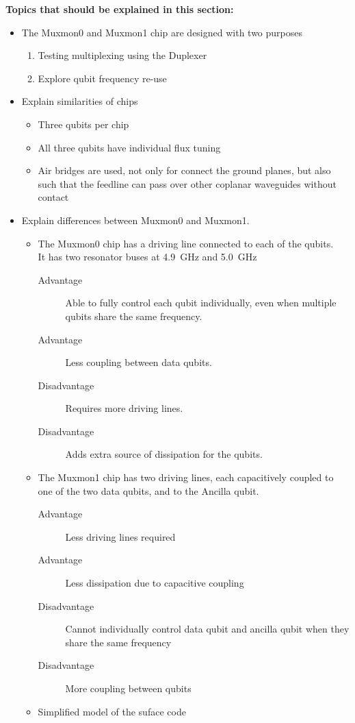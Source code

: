 \documentclass[12pt]{report}
\begin{document}
\textbf{Topics that should be explained in this section:}
\begin{itemize}
    \item The Muxmon0 and Muxmon1 chip are designed with two purposes
    \begin{enumerate}
        \item Testing multiplexing using the Duplexer
        \item Explore qubit frequency re-use
    \end{enumerate}

    \item Explain similarities of chips
    \begin{itemize}
        \item Three qubits per chip
        \item All three qubits have individual flux tuning
        \item Air bridges are used, not only for connect the ground planes, but also such that the feedline can pass over other coplanar waveguides without contact \\
    \end{itemize}

    \item Explain differences between Muxmon0 and Muxmon1.
    \begin{itemize}
        \item The Muxmon0 chip has a driving line connected to each of the qubits. \\
              It has two resonator buses at \SI{4.9}{\giga \hertz} and \SI{5.0}{\giga \hertz}
        \begin{description}
            \item[Advantage] Able to fully control each qubit individually, even when multiple qubits share the same frequency.
            \item[Advantage] Less coupling between data qubits.
            \item[Disadvantage] Requires more driving lines.
            \item[Disadvantage] Adds extra source of dissipation for the qubits.
        \end{description}
        \item The Muxmon1 chip has two driving lines, each capacitively coupled to one of the two data qubits, and to the Ancilla qubit.
        \begin{description}
            \item[Advantage] Less driving lines required
            \item[Advantage] Less dissipation due to capacitive coupling
            \item[Disadvantage] Cannot individually control data qubit and ancilla qubit when they share the same frequency
            \item[Disadvantage] More coupling between qubits
        \end{description}
        \item Simplified model of the suface code
    \end{itemize}


\end{itemize}
\end{document}
